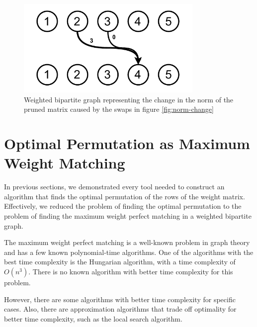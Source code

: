 \begin{figure}[h]
    \centerline{\includegraphics[width=0.8\textwidth]{images/weighted}}
    \caption[Weighted bipartite graph]{Weighted bipartite graph representing the change in the norm of the pruned matrix caused by the swaps in figure \ref{fig:norm-change}}
    \label{fig:weighted}
\end{figure}

\section{Optimal Permutation as Maximum Weight Matching}
In previous sections, we demonstrated every tool needed to construct an algorithm that finds the optimal permutation of the rows of the weight matrix. Effectively, we reduced the problem of finding the optimal permutation to the problem of finding the maximum weight perfect matching in a weighted bipartite graph.

The maximum weight perfect matching is a well-known problem in graph theory and has a few known polynomial-time algorithms. One of the algorithms with the best time complexity is the Hungarian algorithm, with a time complexity of $O(n^3)$. There is no known algorithm with better time complexity for this problem.

However, there are some algorithms with better time complexity for specific cases. Also, there are approximation algorithms that trade off optimality for better time complexity, such as the local search algorithm.
